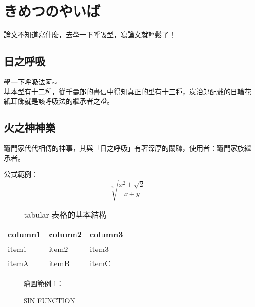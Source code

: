 \chapter{きめつのやいば}\label{structure}

論文不知道寫什麼，去學一下呼吸型，寫論文就輕鬆了！

\section{日之呼吸}
學一下呼吸法阿$\sim$ \\
基本型有十二種，從千壽郎的書信中得知真正的型有十三種，炭治郎配戴的日輪花紙耳飾就是該呼吸法的繼承者之證。

\section{火之神神樂}
竈門家代代相傳的神事，其與「日之呼吸」有著深厚的關聯，使用者：竈門家族繼承者。

公式範例：
\begin{equation}
   \sqrt[n]{\frac{x^2+\sqrt 2}{x+y}}
\end{equation}
\vspace*{3em}
\begin{table}[h]
   \centering
   \caption{tabular 表格的基本結構}\label{booktabs_1}
		\begin{tabular}[t]{lll}
		\hline
		column1 & column2 & column3 \\
		\hline
		item1   & item2   & item3 \\
		itemA   & itemB   & itemC \\
		\hline
		\end{tabular}
\end{table}


\begin{figure}
繪圖範例 1：\\[1em]
   \centering
      \pgfplotsset{width=8cm}          %
   \caption{SIN FUNCTION}\label{fig:SIN FUNCTION}
\end{figure}

